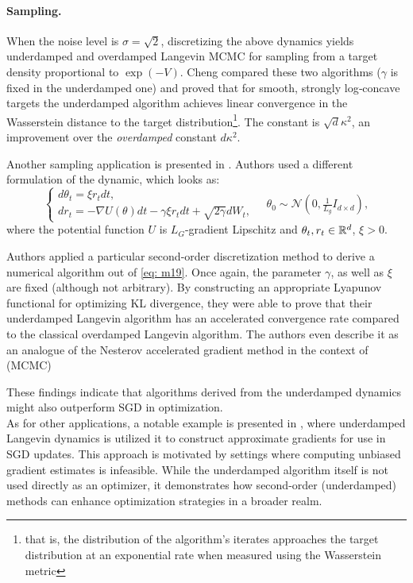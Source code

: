 \documentclass[12pt]{article}
\begin{document}
\paragraph{Sampling.}
\label{par: sampling}
When the noise level is \(\sigma=\sqrt{2}\), discretizing the above dynamics yields underdamped and overdamped Langevin MCMC for sampling from a target density proportional to \(\exp(-V)\).
Cheng \cite{c18} compared these two algorithms ($\gamma$ is fixed in the underdamped one) and proved that for smooth, strongly log‐concave targets the underdamped algorithm achieves linear convergence in the Wasserstein distance to the target distribution\footnote{that is, the distribution of the algorithm's iterates approaches the target distribution at an exponential rate when measured using the Wasserstein metric}.
The constant is \(\sqrt{d}\kappa^{2}\), an improvement over the \emph{overdamped} constant \(d\kappa^{2}\).

Another sampling application is presented in \cite{m19}.
Authors used a different formulation of the dynamic, which looks as:
\begin{equation}
\label{eq: m19}
\begin{cases}
d\theta_t = \xi r_t dt, \\
dr_t = -\nabla U(\theta)dt -\gamma \xi r_tdt + \sqrt{2\gamma} dW_t,
\end{cases}\quad \theta_0\sim\mathcal N\left(0, \tfrac{1}{L_g}I_{d\times d}\right),
\end{equation}
where the potential function $U$ is $L_G$-gradient Lipschitz and $\theta_t, r_t\in{\mathbb{R}}^d$, $\xi>0$.

Authors applied a particular second-order discretization method to derive a numerical algorithm out of \eqref{eq: m19}. Once again, the parameter $\gamma$, as well as $\xi$ are fixed (although not arbitrary).
By constructing an appropriate Lyapunov functional for optimizing KL divergence, they were able to prove that their underdamped Langevin algorithm has an accelerated convergence rate compared to the classical overdamped Langevin algorithm.
The authors even describe it as an analogue of the Nesterov accelerated gradient method in the context of (MCMC)

These findings indicate that algorithms derived from the underdamped dynamics might also outperform SGD in optimization.
\\

As for other applications, a notable example is presented in \cite{qw20}, where underdamped Langevin dynamics is utilized it to construct approximate gradients for use in SGD updates.
This approach is motivated by settings where computing unbiased gradient estimates is infeasible.
While the underdamped algorithm itself is not used directly as an optimizer, it demonstrates how second-order (underdamped) methods can enhance optimization strategies in a broader realm.
\end{document}
